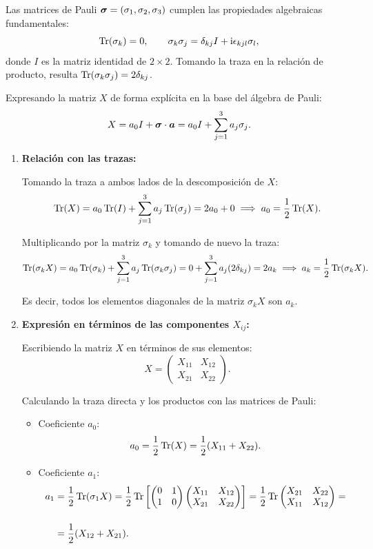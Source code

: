 \begin{resolucion}
Las matrices de Pauli $\bm{\sigma} = (\sigma_1, \sigma_2, \sigma_3)$ cumplen las propiedades algebraicas fundamentales:
\[
\operatorname{Tr}(\sigma_k) = 0, \qquad \sigma_k \sigma_j = \delta_{kj} I + \mathrm{i} \epsilon_{kjl} \sigma_l,
\]
donde $I$ es la matriz identidad de $2 \times 2$. Tomando la traza en la relación de producto, resulta $\operatorname{Tr}(\sigma_k \sigma_j) = 2 \delta_{kj}$.

Expresando la matriz $X$ de forma explícita en la base del álgebra de Pauli:
\[
X = a_0 I + \bm{\sigma} \cdot \bm{a} = a_0 I + \sum_{j=1}^3 a_j \sigma_j.
\]

\begin{enumerate}
  \item \textbf{Relación con las trazas:}

  Tomando la traza a ambos lados de la descomposición de $X$:
  \[
  \operatorname{Tr}(X) = a_0 \operatorname{Tr}(I) + \sum_{j=1}^3 a_j \operatorname{Tr}(\sigma_j) = 2 a_0 + 0 \implies a_0 = \frac{1}{2} \operatorname{Tr}(X).
  \]

  Multiplicando por la matriz $\sigma_k$ y tomando de nuevo la traza:
  \[
  \operatorname{Tr}(\sigma_k X) = a_0 \operatorname{Tr}(\sigma_k) + \sum_{j=1}^3 a_j \operatorname{Tr}(\sigma_k \sigma_j) = 0 + \sum_{j=1}^3 a_j (2\delta_{kj}) = 2 a_k \implies a_k = \frac{1}{2} \operatorname{Tr}(\sigma_k X).
  \]

  Es decir, todos los elementos diagonales de la matriz $\sigma_kX$ son $a_k$.
  \item \textbf{Expresión en términos de las componentes $X_{ij}$:}

  Escribiendo la matriz $X$ en términos de sus elementos:
  \[
  X = \begin{pmatrix} X_{11} & X_{12} \\ X_{21} & X_{22} \end{pmatrix}.
  \]

  Calculando la traza directa y los productos con las matrices de Pauli:
  \begin{itemize}
    \item Coeficiente $a_0$:
    \[
    a_0 = \frac{1}{2} \operatorname{Tr}(X) = \frac{1}{2} (X_{11} + X_{22}).
    \]
    
    \item Coeficiente $a_1$:
    \begin{align*}
        a_1 & = \frac{1}{2} \operatorname{Tr}(\sigma_1 X) = \frac{1}{2} \operatorname{Tr} \left[ \begin{pmatrix} 0 & 1 \\ 1 & 0 \end{pmatrix} \begin{pmatrix} X_{11} & X_{12} \\ X_{21} & X_{22} \end{pmatrix} \right] = \frac{1}{2} \operatorname{Tr} \begin{pmatrix} X_{21} & X_{22} \\ X_{11} & X_{12} \end{pmatrix} = \\[12pt]
        & = \frac{1}{2} (X_{12} + X_{21}).
    \end{align*}


\end{itemize}
\end{enumerate}
\end{resolucion}
